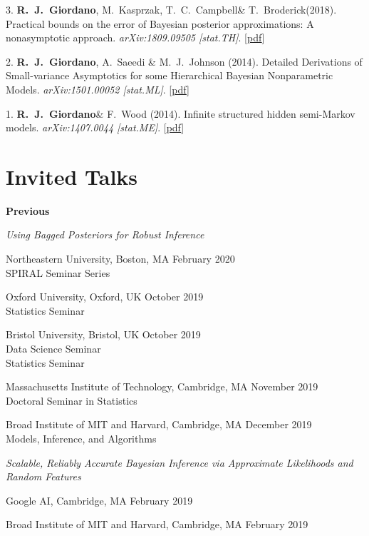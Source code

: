 \documentclass[margin,line]{res}
\newenvironment{talkgroup}{\setlength{\parskip}{3pt}\everypar{\hangafter=1\hangindent=1em\relax}\par}{\par\everypar{\hangafter=0\relax}}
\newcommand{\me}{\textbf{R.~J.~Giordano}\xspace}
\newcommand{\trevor}{T.~C.~Campbell\xspace}
\newcommand{\tamara}{T.~Broderick\xspace}
\newcommand{\paperref}[1]{[\href{#1}{pdf}]}
\newcommand{\paperref}[1]{}
\begin{document}
\begin{resume}
3. \me, M.~Kasprzak, \trevor \& \tamara (2018).
Practical bounds on the error of Bayesian posterior approximations: A nonasymptotic approach.
\emph{arXiv:1809.09505 [stat.TH]}.
\paperref{https://arxiv.org/abs/1809.09505}

2. \me, A.~Saeedi \& M.~J.~Johnson (2014).
Detailed Derivations of Small-variance Asymptotics for some Hierarchical Bayesian Nonparametric Models.
\emph{arXiv:1501.00052 [stat.ML]}.
\paperref{http://arxiv.org/abs/1501.00052}

1. \me \& F.~Wood (2014).
Infinite structured hidden semi-Markov models.
\emph{arXiv:1407.0044 [stat.ME]}.
\paperref{http://arxiv.org/abs/1407.0044}



\section{\sc Invited Talks}

\textbf{Previous}

\emph{Using Bagged Posteriors for Robust Inference}

\begin{talkgroup}
Northeastern University, Boston, MA \hfill February 2020 \\
SPIRAL Seminar Series

Oxford University, Oxford, UK \hfill October 2019 \\
Statistics Seminar

Bristol University, Bristol, UK \hfill October 2019 \\
Data Science Seminar \\
Statistics Seminar

Massachusetts Institute of Technology, Cambridge, MA  \hfill November 2019 \\
Doctoral Seminar in Statistics

Broad Institute of MIT and Harvard, Cambridge, MA \hfill December 2019 \\
Models, Inference, and Algorithms

\end{talkgroup}

\emph{Scalable, Reliably Accurate Bayesian Inference via Approximate Likelihoods and Random Features}

\begin{talkgroup}
Google AI, Cambridge, MA \hfill February 2019

Broad Institute of MIT and Harvard, Cambridge, MA \hfill February 2019


\end{talkgroup}
\end{resume}
\end{document}

